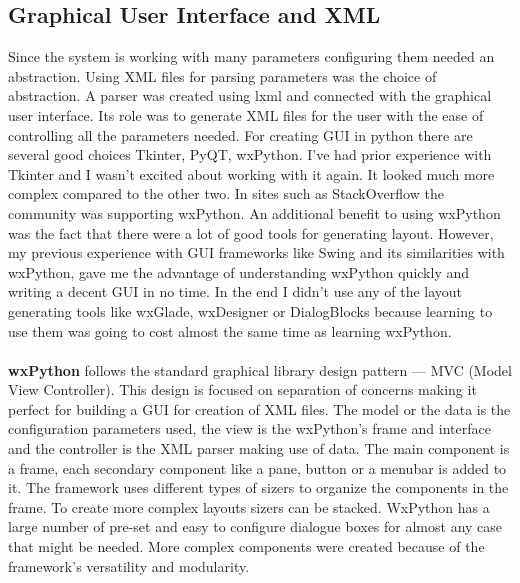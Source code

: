 \subsection{Graphical User Interface and XML}
Since the system is working with many parameters configuring them needed an abstraction. Using XML files for parsing parameters was the choice of abstraction. A parser was created
using lxml\cite{lxml} and connected with the graphical user interface.
Its role was to generate XML files for the user with the ease of controlling all the parameters needed.
For creating GUI in python there are several good choices Tkinter, PyQT, wxPython. I've had prior experience with Tkinter and I wasn't excited about working with it again. It looked
much more complex compared to the other two. In sites such as StackOverflow the community was supporting wxPython. An additional benefit to using wxPython was the fact that there were a
lot of good tools for generating layout. However, my previous experience with GUI frameworks like Swing and its similarities with wxPython, gave me the advantage of understanding wxPython
quickly and writing a decent GUI in no time. In the end I didn't use any of the layout generating tools like wxGlade, wxDesigner or DialogBlocks because learning to use them was going to
cost almost the same time as learning wxPython.
\paragraph{}
\textbf{wxPython} follows the standard graphical library design pattern --- MVC (Model View Controller).
This design is focused on separation of concerns making it perfect for building a GUI for creation of XML files. The model or the 
data is the configuration parameters used, the view is the wxPython's frame and interface and the controller is the XML parser making use of data.
The main component is a frame, each secondary component like a pane, button or a menubar
is added to it. The framework uses different types of sizers to organize the components in the frame. To create more complex layouts
sizers can be stacked. WxPython has a large number of pre-set and easy to configure dialogue boxes for almost any case that might be needed.
More complex components were created because of  the framework's versatility and modularity.
